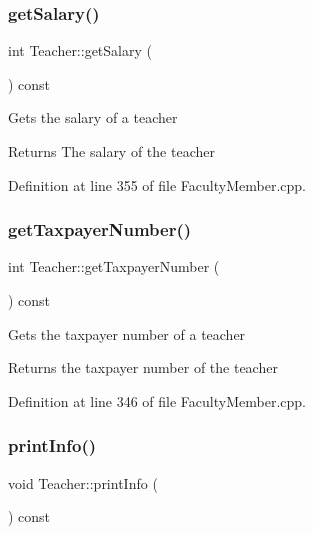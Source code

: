 \subsubsection{\texorpdfstring{get\+Salary()}{getSalary()}}
{\footnotesize\ttfamily int Teacher\+::get\+Salary (\begin{DoxyParamCaption}{ }\end{DoxyParamCaption}) const}

Gets the salary of a teacher \begin{DoxyReturn}{Returns}
The salary of the teacher 
\end{DoxyReturn}


Definition at line 355 of file Faculty\+Member.\+cpp.

\mbox{\label{classTeacher_a3799bff1314b56a805273da1166304a3}} 
\subsubsection{\texorpdfstring{get\+Taxpayer\+Number()}{getTaxpayerNumber()}}
{\footnotesize\ttfamily int Teacher\+::get\+Taxpayer\+Number (\begin{DoxyParamCaption}{ }\end{DoxyParamCaption}) const}

Gets the taxpayer number of a teacher \begin{DoxyReturn}{Returns}
the taxpayer number of the teacher 
\end{DoxyReturn}


Definition at line 346 of file Faculty\+Member.\+cpp.

\mbox{\label{classTeacher_ae1fc6d174a25c714bfb73abf4620de03}} 
\subsubsection{\texorpdfstring{print\+Info()}{printInfo()}}
{\footnotesize\ttfamily void Teacher\+::print\+Info (\begin{DoxyParamCaption}{ }\end{DoxyParamCaption}) const\hspace{0.3cm}{\ttfamily [virtual]}}

